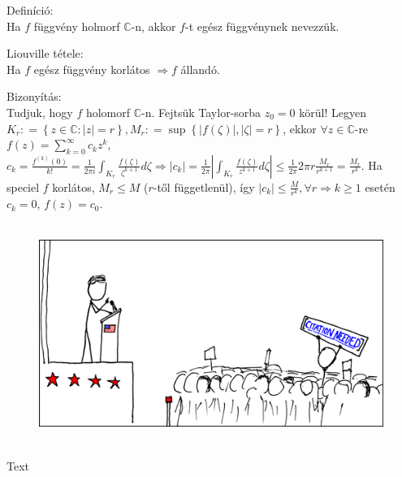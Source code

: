 \documentclass[12pt,a4paper]{scrartcl}
\newenvironment{definicio}{}{}
\newenvironment{tetel}{}{}
\newenvironment{bizonyitas}{}{}
\newenvironment{ajanlofig}{\begin{figure}\begin{center}}{
\end{center}\end{figure}}
\begin{document}
\begin{definicio}

Definíció:\\
Ha \(f\) függvény holmorf \(\mathbb{C}\)-n, akkor \(f\)-t egész
függvénynek nevezzük.

\end{definicio}

\begin{tetel}

Liouville tétele:\\
Ha \(f\) egész függvény korlátos \(\left. \Rightarrow f \right.\)
állandó.

\end{tetel}

\begin{bizonyitas}

Bizonyítás:\\
Tudjuk, hogy \(f\) holomorf \(\mathbb{C}\)-n. Fejtsük Taylor-sorba
\(z_{0} = 0\) körül! Legyen
\(K_{r}: = \left\{ {z \in {\mathbb{C}}:\left| z \right| = r} \right\},M_{r}: = \sup\left\{ {\left| {f\left( \zeta \right)} \right|,\left| \zeta \right| = r} \right\}\),
ekkor \(\forall z \in {\mathbb{C}}\)-re
\(f\left( z \right) = {\sum\limits_{k = 0}^{\infty}{c_{k}z^{k}}}\),
\(\left. c_{k} = \frac{f^{(k)}\left( 0 \right)}{k!} = \frac{1}{2\pi i}{\int_{K_{r}}{\frac{f\left( \zeta \right)}{\zeta^{k + 1}}d\zeta}}\Rightarrow\left| c_{k} \right| = \frac{1}{2\pi}\left| {\int_{K_{r}}{\frac{f\left( \zeta \right)}{z^{k + 1}}d\zeta}} \right| \leq \frac{1}{2\pi}2\pi r\frac{M_{r}}{r^{k + 1}} = \frac{M_{r}}{r^{k}} \right.\).
Ha speciel \(f\) korlátos, \(M_{r} \leq M\) (\(r\)-től függetlenül), így
\(\left. \left| c_{k} \right| \leq \frac{M}{r^{k}},\forall r\Rightarrow k \geq 1 \right.\)
esetén \(c_{k} = 0\), \(f\left( z \right) = c_{0}\).

\end{bizonyitas}

\begin{ajanlo}

\begin{ajanlofig}

\href{https://xkcd.com}{\includegraphics[width=5.20833in,height=2.82292in]{wikipedian_protester.png}}

\end{ajanlofig}

Text

\end{ajanlo}
\end{document}
